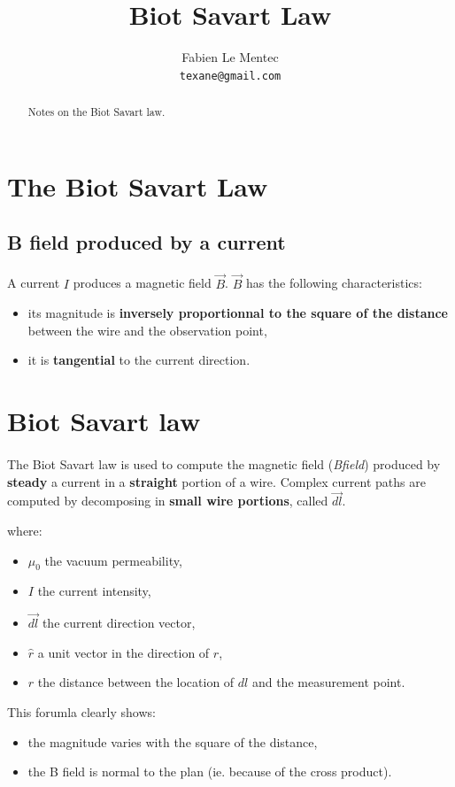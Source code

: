 \documentclass[12pt]{article}
\title{Biot Savart Law}
\author{Fabien Le Mentec\\
\small \texttt{texane@gmail.com}
}
\date{}
\begin{document}
\maketitle

\newpage
\begin{abstract}
Notes on the Biot Savart law.
\end{abstract}

\newpage
\section{The Biot Savart Law}

\subsection{B field produced by a current}
\paragraph{} A current $I$ produces a magnetic field $\vec{B}$. $\vec{B}$ has the following characteristics:
\begin{itemize}
  \item its magnitude is \textbf{inversely proportionnal to the square of the distance} between the
    wire and the observation point,
  \item it is \textbf{tangential} to the current direction.
\end{itemize}

\section{Biot Savart law}
\paragraph{} The Biot Savart law is used to compute the magnetic field (\textit{Bfield}) produced by
\textbf{steady} a current in a \textbf{straight} portion of a wire. Complex current paths are computed
by decomposing in \textbf{small wire portions}, called $\vec{dl}$.
\begin{center}
\end{center}
where:
\begin{itemize}
\item $\mu_{0}$ the vacuum permeability,
\item $I$ the current intensity,
\item $\vec{dl}$ the current direction vector,
\item $\hat{r}$ a unit vector in the direction of $r$,
\item $r$ the distance between the location of $dl$ and the measurement point.
\end{itemize}
This forumla clearly shows:
\begin{itemize}
  \item the magnitude varies with the square of the distance,
  \item the B field is normal to the plan (ie. because of the cross product).
\end{itemize}
\end{document}

